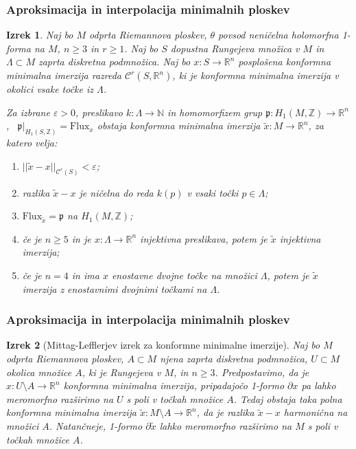 \documentclass[9pt, table]{beamer}
\newtheorem{izrek}{Izrek}
\newcommand{\R}{\mathbb R}
\newcommand{\N}{\mathbb N}
\newcommand{\Z}{\mathbb Z}
\begin{document}
\begin{frame}
\frametitle{Aproksimacija in interpolacija minimalnih ploskev}

\begin{izrek}
Naj bo $M$ odprta Riemannova ploskev, $\theta$ povsod neničelna holomorfna 1-forma na $M$, $n \geq 3$ in $r \geq 1$.
Naj bo $S$ dopustna Rungejeva množica v $M$ in $\Lambda \subset M$ zaprta diskretna podmnožica. 
Naj bo $x \colon S \to \R^{n}$ posplošena konformna minimalna imerzija razreda $\mathcal{C}^{r}(S, \R^{n})$, ki je konformna minimalna imerzija v okolici vsake točke iz $\Lambda$.

Za izbrane $\varepsilon > 0$, preslikavo $k \colon \Lambda \to \N$ in homomorfizem grup $\mathfrak{p} \colon H_{1}(M,\Z) \to \R^{n}$, \ $\mathfrak{p}|_{H_{1}(S,\Z)} = \mathrm{Flux}_{x}$ obstaja konformna minimalna imerzija $\tilde{x} \colon M \to \R^{n}$, za katero velja:
\begin{enumerate}
\item $||\tilde{x} - x||_{\mathcal{C}^{r}(S)} < \varepsilon$;
\item razlika $\tilde{x}-x$ je ničelna do reda $k(p)$ v vsaki točki $p\in \Lambda$;
\item $\mathrm{Flux}_{\tilde{x}} = \mathfrak{p}$ na $H_{1}(M,\Z)$;
\item če je $n\geq5$ in je $x \colon \Lambda \to \R^{n}$ injektivna preslikava, potem je $\tilde{x}$ injektivna imerzija;
\item če je $n=4$ in ima $x$ enostavne dvojne točke na množici $\Lambda$, potem je $\tilde{x}$ imerzija z enostavnimi dvojnimi točkami na $\Lambda$.
\end{enumerate}
\end{izrek}

\end{frame}


\begin{frame}
\frametitle{Aproksimacija in interpolacija minimalnih ploskev}

\begin{izrek} [Mittag-Lefflerjev izrek za konformne minimalne imerzije]
Naj bo $M$ odprta Riemannova ploskev, $A \subset M$ njena zaprta diskretna podmnožica, $U \subset M$ okolica množice $A$, ki je Rungejeva v $M$, in $n \geq 3$.
Predpostavimo, da je $x \colon U \setminus A \to \R^{n}$ konformna minimalna imerzija, pripadajočo 1-formo $\partial x$ pa lahko meromorfno razširimo na $U$ s poli v točkah množice $A$.
Tedaj obstaja taka polna konformna minimalna imerzija $\tilde{x} \colon M \setminus A \to \R^{n}$, da je razlika $\tilde{x}-x$ harmonična na množici $A$.
Natančneje, 1-formo $\partial \tilde{x}$ lahko meromorfno razširimo na $M$ s poli v točkah množice $A$.
\end{izrek}

\end{frame}
\end{document}
